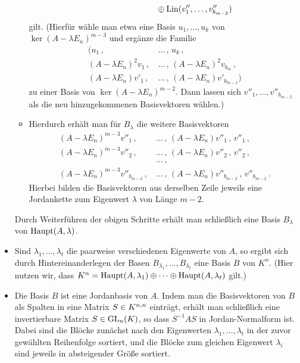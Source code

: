\documentclass[a4paper,10pt,numbers = noenddot]{scrartcl}
\begin{document}
\begin{itemize}[resume]
\begin{itemize}
\begin{align*}
           &\,          \phantom{\ker (A - \lambda E_n)^{m-2}\,}
                \oplus  \Lin( v''_1, \dotsc, v''_{b_{m-2}}  )
        \end{align*}
        gilt.
        (Hierfür wähle man etwa eine Basis $u_1, \dotsc, u_k$ von $\ker (A - \lambda E_n)^{m-3}$ und ergänze die Familie
        \begin{align*}
          \bigl(
            u_1 \,,\, &\dotsc \,,\, u_k \,,
            \\
            (A - \lambda E_n)^2 v_1 \,,\, &\dotsc \,,\, (A - \lambda E_n)^2 v_{b_m} \,,
            \\
            (A - \lambda E_n) v'_1 \,,\, &\dotsc \,,\, (A - \lambda E_n) v'_{b_{m-1}}
          \bigr)
        \end{align*}
        zu einer Basis von $\ker (A - \lambda E_n)^{m-2}$.
        Dann lassen sich $v''_1, \dotsc, v''_{b_{m-2}}$ als die neu hinzugekommenen Basisvektoren wählen.)
      \item
        Hierdurch erhält man für $B_\lambda$ die weitere Basisvektoren
        \begin{align*}
          (A - \lambda E_n)^{m-3} v''_1\,,\,
          &\dotsc\,,\,  (A - \lambda E_n) v''_1\,,\,
          v''_1\,,
          \\
          (A - \lambda E_n)^{m-3} v''_2\,,\,
          &\dotsc\,,\,
          (A - \lambda E_n) v''_2\,,\,
          v''_2\,,
          \\
          &\dotsc\,,
          \\
          (A - \lambda E_n)^{m-3} v''_{b_{m-2}}\,,\,
          &\dotsc\,,\,
          (A - \lambda E_n) v''_{b_{m-2}}\,,\,
          v''_{b_{m-2}} \,.
        \end{align*}
        Hierbei bilden die Basisvektoren aus derselben Zeile jeweils eine Jordankette zum Eigenwert $\lambda$ von Länge $m-2$.
    \end{itemize}
    Durch Weiterführen der obigen Schritte erhält man schließlich eine Basis $B_\lambda$ von $\hauptspace{A}{\lambda}$.
    
  \item
    Sind $\lambda_1, \dotsc, \lambda_t$ die paarweise verschiedenen Eigenwerte von $A$, so ergibt sich durch Hintereinanderlegen der Basen $B_{\lambda_1}, \dotsc, B_{\lambda_t}$ eine Basis $B$ von $K^n$.
    (Hier nutzen wir, dass $K^n = \hauptspace{A}{\lambda_1} \oplus \dotsb \oplus \hauptspace{A}{\lambda_t}$ gilt.)
 
  \item
    Die Basis $B$ ist eine Jordanbasis von $A$.
    Indem man die Basisvektoren von $B$ als Spalten in eine Matrix $S \in \matrices{n}{K}$ einträgt, erhält man schließlich eine invertierbare Matrix $S \in \GL{n}{K}$, so dass $S^{-1} A S$ in Jordan-Normalform ist.
    Dabei sind die Blöcke zunächst nach den Eigenwerten $\lambda_1, \dotsc, \lambda_t$ in der zuvor gewählten Reihenfolge sortiert, und die Blöcke zum gleichen Eigenwert $\lambda_i$ sind jeweils in absteigender Größe sortiert.
\end{itemize}
\end{document}
